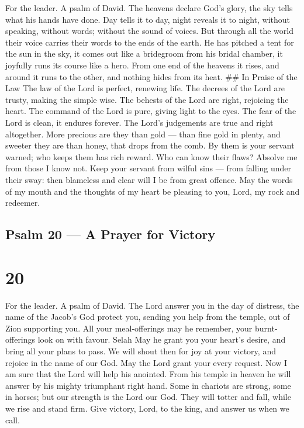 For the leader. A psalm of David.  The heavens declare God's
glory, the sky tells what his hands have done.  Day tells it
to day, night reveals it to night,  without speaking,
without words; without the sound of voices.  But through all
the world their voice carries their words to the ends of the earth. He
has pitched a tent for the sun in the sky,  it comes out
like a bridegroom from his bridal chamber, it joyfully runs its course
like a hero.  From one end of the heavens it rises, and
around it runs to the other, and nothing hides from its heat. \#\# In
Praise of the Law  The law of the Lord is perfect, renewing
life. The decrees of the Lord are trusty, making the simple wise.
 The behests of the Lord are right, rejoicing the heart. The
command of the Lord is pure, giving light to the eyes.  The
fear of the Lord is clean, it endures forever. The Lord's judgements are
true and right altogether.  More precious are they than
gold --- than fine gold in plenty, and sweeter they are than honey, that
drops from the comb.  By them is your servant warned; who
keeps them has rich reward.  Who can know their flaws?
Absolve me from those I know not.  Keep your servant from
wilful sins --- from falling under their sway: then blameless and clear
will I be from great offence.  May the words of my mouth
and the thoughts of my heart be pleasing to you, Lord, my rock and
redeemer.

\hypertarget{psalm-20-a-prayer-for-victory}{%
\subsection{Psalm 20 --- A Prayer for
Victory}\label{psalm-20-a-prayer-for-victory}}

\hypertarget{section-19}{%
\section{20}\label{section-19}}

For the leader. A psalm of David.  The Lord answer you in
the day of distress, the name of the Jacob's God protect you,
 sending you help from the temple, out of Zion supporting
you.  All your meal-offerings may he remember, your
burnt-offerings look on with favour. Selah  May he grant you
your heart's desire, and bring all your plans to pass.  We
will shout then for joy at your victory, and rejoice in the name of our
God. May the Lord grant your every request.  Now I am sure
that the Lord will help his anointed. From his temple in heaven he will
answer by his mighty triumphant right hand.  Some in
chariots are strong, some in horses; but our strength is the Lord our
God.  They will totter and fall, while we rise and stand
firm.  Give victory, Lord, to the king, and answer us when
we call.

